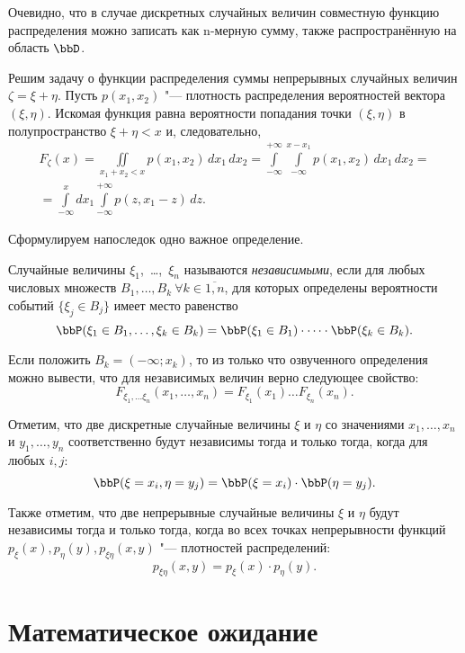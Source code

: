 Очевидно, что в случае дискретных случайных величин совместную функцию распределения можно записать как n-мерную сумму, также распространённую на область $\bbD$.


Решим задачу о функции распределения суммы непрерывных случайных величин $\zeta=\xi+\eta$. Пусть $p(x_1,x_2)$ "--- плотность распределения вероятностей вектора $(\xi,\eta)$. Искомая функция равна вероятности попадания точки $(\xi,\eta)$ в полупространство $\xi+\eta<x$ и, следовательно, 
\begin{multline}\label{ch31.1eq1}
F_{\zeta}(x)=\iint\limits_{x_1+x_2<x} p(x_1,x_2)\,dx_1\, dx_2=\int\limits_{-\infty}^{+\infty}\int\limits_{-\infty}^{x-x_1}p(x_1,x_2)\,dx_1\, dx_2=\\
=\int\limits_{-\infty}^{x}dx_1\int\limits_{-\infty}^{+\infty} p(z,x_1-z)\,dz.
\end{multline}

Сформулируем напоследок одно важное определение.
\begin{defn} Случайные величины $\xi_1$,~\dots,~$\xi_n$ называются \textit{независимыми}, если для любых числовых множеств $B_1,\dots, B_k\ \forall k\in\overline{1,n}$, для которых определены вероятности событий $\{\xi_j\in B_j\}$ имеет место равенство
$$
\bbP(\xi_1\in B_1,\dots, \xi_k \in B_k)=\bbP(\xi_1\in B_1)\cdot\dots\cdot \bbP(\xi_k \in B_k).
$$
\end{defn}

Если положить $B_k=(-\infty;x_k)$, то из только что озвученного определения можно вывести, что для независимых величин верно следующее свойство:
$$
F_{\xi_1,\dots\xi_n}(x_1,\dots,x_n)=F_{\xi_1}(x_1)\dots F_{\xi_n}(x_n).
$$

Отметим, что две дискретные случайные величины $\xi$ и $\eta$ со значениями $x_1,\dots,x_n$ и $y_1,\dots,y_n$ соответственно будут независимы тогда и только тогда, когда для любых $i,j$:
$$
\bbP(\xi = x_i, \eta = y_j) = \bbP (\xi = x_i)\cdot \bbP(\eta=y_j).
$$

Также отметим, что две непрерывные случайные величины $\xi$ и $\eta$ будут независимы тогда и только тогда, когда во всех точках непрерывности функций $p_\xi(x),p_\eta(y),p_{\xi\eta}(x,y)$ "--- плотностей распределений:
$$
p_{\xi\eta}(x,y)=p_\xi(x)\cdot p_\eta(y).
$$ 

\section{Математическое ожидание}

